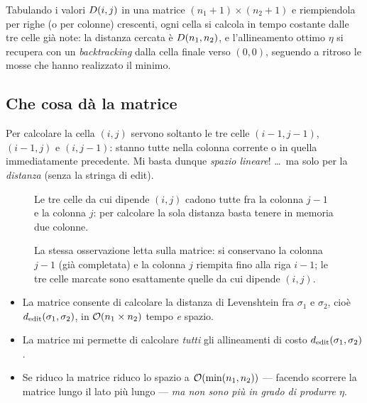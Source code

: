 Tabulando i valori $D(i,j)$ in una matrice $(n_1+1)\times(n_2+1)$ e
riempiendola per righe (o per colonne) crescenti, ogni cella si calcola in
tempo costante dalle tre celle già note: la distanza cercata è $D(n_1,n_2)$,
e l'allineamento ottimo $\eta$ si recupera con un \emph{backtracking} dalla
cella finale verso $(0,0)$, seguendo a ritroso le mosse che hanno realizzato il
minimo.

\subsection{Che cosa dà la matrice}

%
Per calcolare la cella $(i,j)$ servono soltanto le tre celle $(i-1,j-1)$,
$(i-1,j)$ e $(i,j-1)$: stanno tutte nella colonna corrente o in quella
immediatamente precedente. Mi basta dunque \emph{spazio lineare}! \dots\ ma solo
per la \emph{distanza} (senza la stringa di edit).

\begin{figure}[H]
  \centering
  
  \caption{Le tre celle da cui dipende $(i,j)$ cadono tutte fra la colonna $j-1$
  e la colonna $j$: per calcolare la sola distanza basta tenere in memoria due
  colonne.}
  \label{fig:dp-stencil-lineare}
\end{figure}

\begin{figure}[H]
  \centering
  
  \caption{La stessa osservazione letta sulla matrice: si conservano la colonna
  $j-1$ (già completata) e la colonna $j$ riempita fino alla riga $i-1$; le tre
  celle marcate sono esattamente quelle da cui dipende $(i,j)$.}
  \label{fig:dp-due-colonne}
\end{figure}

\begin{itemize}
  \item La matrice consente di calcolare la distanza di Levenshtein fra
        $\sigma_1$ e $\sigma_2$, cioè $d_{\mathrm{edit}}(\sigma_1,\sigma_2)$, in
        $\mathcal{O}(n_1\times n_2)$ tempo \emph{e} spazio.
  \item La matrice mi permette di calcolare \emph{tutti} gli allineamenti di
        costo $d_{\mathrm{edit}}(\sigma_1,\sigma_2)$.
  \item Se riduco la matrice  riduco lo
        spazio a $\mathcal{O}(\min(n_1,n_2))$ --- facendo scorrere la matrice lungo il
        lato più lungo --- \emph{ma non sono più in grado di produrre $\eta$}.
\end{itemize}

